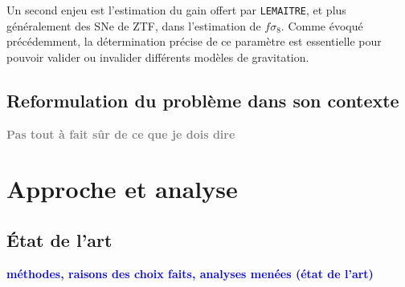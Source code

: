 \documentclass{book}
\newcommand{\todo}[1]{{\textcolor{gray}{\bf \large #1}}}
\newcommand{\consignes}[1]{{\textcolor{blue}{\bf \large #1}}}
\def\lemaitre{\texttt{LEMAITRE}\xspace}
\begin{document}
Un second enjeu est l'estimation du gain offert par \lemaitre, et plus généralement des SNe de ZTF, dans l'estimation de $f\sigma_8$. Comme évoqué précédemment, la détermination précise de ce paramètre est essentielle pour pouvoir valider ou invalider différents modèles de gravitation.



\section{Reformulation du problème dans son contexte}

\todo{Pas tout à fait sûr de ce que je dois dire}

\chapter{Approche et analyse}

\section{État de l'art}
\consignes{méthodes, raisons des choix faits, analyses menées (état de l’art)}
\end{document}
